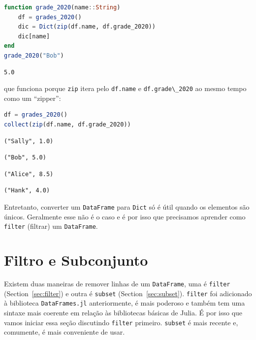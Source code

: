 \documentclass[
  notoc %
]{tufte-book}
\newcommand{\passthrough}[1]{#1}
\begin{document}
\begin{lstlisting}[language=Julia]
function grade_2020(name::String)
    df = grades_2020()
    dic = Dict(zip(df.name, df.grade_2020))
    dic[name]
end
grade_2020("Bob")
\end{lstlisting}

\begin{lstlisting}[language=Output]
5.0
\end{lstlisting}

que funciona porque \passthrough{\lstinline!zip!} itera pelo
\passthrough{\lstinline!df.name!} e
\passthrough{\lstinline!df.grade\_2020!} ao mesmo tempo como um
``zipper'':

\begin{lstlisting}[language=Julia]
df = grades_2020()
collect(zip(df.name, df.grade_2020))
\end{lstlisting}

\begin{lstlisting}[language=Output]
("Sally", 1.0)
\end{lstlisting}

\begin{lstlisting}[language=Output]
("Bob", 5.0)
\end{lstlisting}

\begin{lstlisting}[language=Output]
("Alice", 8.5)
\end{lstlisting}

\begin{lstlisting}[language=Output]
("Hank", 4.0)
\end{lstlisting}

Entretanto, converter um \passthrough{\lstinline!DataFrame!} para
\passthrough{\lstinline!Dict!} só é útil quando os elementos são únicos.
Geralmente esse não é o caso e é por isso que precisamos aprender como
\passthrough{\lstinline!filter!} (filtrar) um
\passthrough{\lstinline!DataFrame!}.

\hypertarget{sec:filter_subset}{%
\section{Filtro e Subconjunto}\label{sec:filter_subset}}

Existem duas maneiras de remover linhas de um
\passthrough{\lstinline!DataFrame!}, uma é
\passthrough{\lstinline!filter!} (Section~\ref{sec:filter}) e outra é
\passthrough{\lstinline!subset!} (Section~\ref{sec:subset}).
\passthrough{\lstinline!filter!} foi adicionado à biblioteca
\passthrough{\lstinline!DataFrames.jl!} anteriormente, é mais poderoso e
também tem uma sintaxe mais coerente em relação às bibliotecas básicas
de Julia. É por isso que vamos iniciar essa seção discutindo
\passthrough{\lstinline!filter!} primeiro.
\passthrough{\lstinline!subset!} é mais recente e, comumente, é mais
conveniente de usar.
\end{document}
